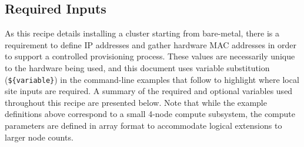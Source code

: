 
\subsection{Required Inputs} \label{sec:inputs}
As this recipe details installing a cluster starting from bare-metal, there is a requirement to define IP addresses and  gather hardware MAC addresses in order to support a controlled provisioning process. These values are necessarily unique to the hardware being used, and this document uses variable substitution (\texttt{\$\{variable\}}) in the command-line examples that follow to highlight where local site inputs are required. 
A summary of the required and optional variables
used throughout this recipe are presented below. Note that while the example definitions above correspond to a small 4-node compute subsystem, the compute parameters are defined in array format to accommodate logical extensions to larger node counts. 

